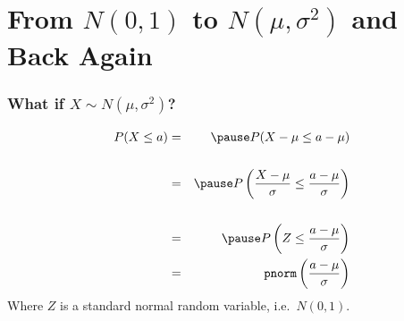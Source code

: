 \section{From $N(0,1)$ to $N(\mu, \sigma^2)$ and Back Again}
\begin{frame}
\frametitle{What if $X \sim N(\mu, \sigma^2)$?}
\begin{eqnarray*}
	P(X \leq a) &=& \pause P(X - \mu \leq a - \mu)\\\\
		&=& \pause P\left( \frac{X-\mu}{\sigma} \leq \frac{a - \mu}{\sigma} \right)\\\\
		&=&\pause  P\left(Z \leq  \frac{a - \mu}{\sigma}\right)\\
    &=& \texttt{pnorm}\left( \frac{a - \mu}{\sigma} \right)
\end{eqnarray*}
Where $Z$ is a standard normal random variable, i.e.\ $N(0,1)$.
\end{frame}



